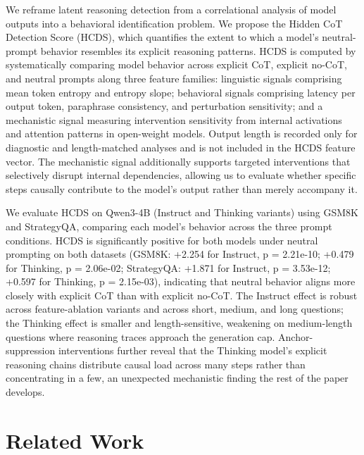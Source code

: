 \documentclass{article}
\theoremstyle{plain}
\theoremstyle{definition}
\theoremstyle{remark}
\begin{document}
We reframe latent reasoning detection from a correlational analysis of model outputs into a behavioral identification problem. We propose the Hidden CoT Detection Score (HCDS), which quantifies the extent to which a model's neutral-prompt behavior resembles its explicit reasoning patterns. HCDS is computed by systematically comparing model behavior across explicit CoT, explicit no-CoT, and neutral prompts along three feature families: linguistic signals comprising mean token entropy and entropy slope; behavioral signals comprising latency per output token, paraphrase consistency, and perturbation sensitivity; and a mechanistic signal measuring intervention sensitivity from internal activations and attention patterns in open-weight models. Output length is recorded only for diagnostic and length-matched analyses and is not included in the HCDS feature vector. The mechanistic signal additionally supports targeted interventions that selectively disrupt internal dependencies, allowing us to evaluate whether specific steps causally contribute to the model's output rather than merely accompany it.

We evaluate HCDS on Qwen3-4B (Instruct and Thinking variants) using GSM8K and StrategyQA, comparing each model's behavior across the three prompt conditions. HCDS is significantly positive for both models under neutral prompting on both datasets (GSM8K: +2.254 for Instruct, p = 2.21e-10; +0.479 for Thinking, p = 2.06e-02; StrategyQA: +1.871 for Instruct, p = 3.53e-12; +0.597 for Thinking, p = 2.15e-03), indicating that neutral behavior aligns more closely with explicit CoT than with explicit no-CoT. The Instruct effect is robust across feature-ablation variants and across short, medium, and long questions; the Thinking effect is smaller and length-sensitive, weakening on medium-length questions where reasoning traces approach the generation cap. Anchor-suppression interventions further reveal that the Thinking model's explicit reasoning chains distribute causal load across many steps rather than concentrating in a few, an unexpected mechanistic finding the rest of the paper develops.


\section{Related Work}
\end{document}
